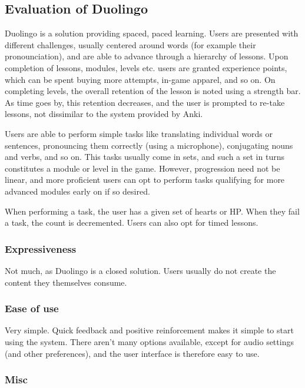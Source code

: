 \subsection{Evaluation of Duolingo}

Duolingo is a solution providing spaced, paced learning. Users are presented
with different challenges, usually centered around words (for example their
pronounciation), and are able to advance through a hierarchy of lessons. Upon
completion of lessons, modules, levels etc. users are granted experience points,
which can be spent buying more attempts, in-game apparel, and so on. On
completing levels, the overall retention of the lesson is noted using a strength
bar. As time goes by, this retention decreases, and the user is prompted to
re-take lessons, not dissimilar to the system provided by Anki.

Users are able to perform simple tasks like translating individual words or
sentences, pronouncing them correctly (using a microphone), conjugating nouns
and verbs, and so on. This tasks usually come in sets, and such a set in turns
constitutes a module or level in the game. However, progression need not be
linear, and more proficient users can opt to perform tasks qualifying for more
advanced modules early on if so desired.

When performing a task, the user has a given set of hearts or HP. When they fail
a task, the count is decremented. Users can also opt for timed lessons.

\subsubsection{Expressiveness}

Not much, as Duolingo is a closed solution. Users usually do not create the
content they themselves consume.

\subsubsection{Ease of use}

Very simple. Quick feedback and positive reinforcement makes it simple to start
using the system. There aren't many options available, except for audio settings
(and other preferences), and the user interface is therefore easy to use.

\subsubsection{Misc}

